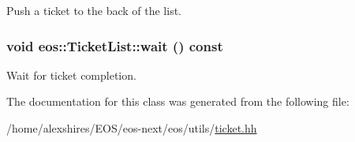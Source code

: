 Push a ticket to the back of the list. \hypertarget{classeos_1_1TicketList_ac152da1ea00be93a0c59150f132c6ad3}{
\subsubsection[{wait}]{\setlength{\rightskip}{0pt plus 5cm}void eos::TicketList::wait () const}}
\label{classeos_1_1TicketList_ac152da1ea00be93a0c59150f132c6ad3}


Wait for ticket completion. 

The documentation for this class was generated from the following file:\begin{DoxyCompactItemize}
\item 
/home/alexshires/EOS/eos-\/next/eos/utils/\hyperlink{ticket_8hh}{ticket.hh}\end{DoxyCompactItemize}
